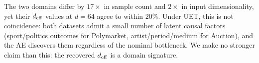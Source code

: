 \begin{remark}
The two domains differ by $17\times$ in sample count and $2\times$ in
input dimensionality, yet their $d_{\mathrm{eff}}$ values at $d=64$ agree to within
$20\%$. Under UET, this is not coincidence: both datasets admit a
small number of latent causal factors (sport/politics outcomes for
Polymarket, artist/period/medium for Auction), and the AE discovers them
regardless of the nominal bottleneck. We make no stronger claim than
this: the recovered $d_{\mathrm{eff}}$ is a domain signature.
\end{remark}
